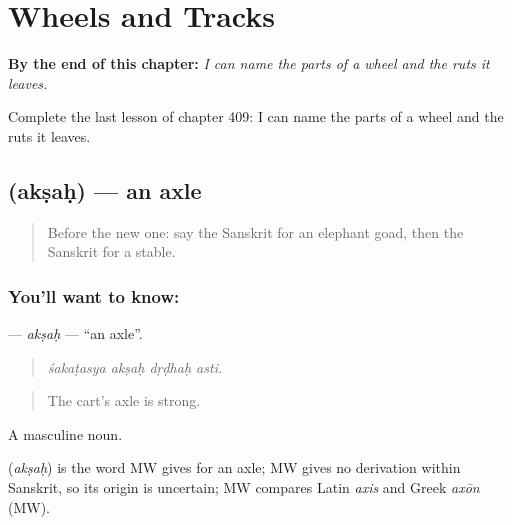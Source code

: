 
\chapter{Wheels and Tracks}
\label{ch:sa-wheels-and-tracks}

\begin{chapteropening}
\textbf{By the end of this chapter:} \emph{I can name the parts of a wheel and the ruts it leaves.}

Complete the last lesson of chapter 409: I can name the parts of a wheel and the ruts it leaves.
\end{chapteropening}

\section[\texorpdfstring{\sk{अक्षः} (akṣaḥ)}{अक्षः (akṣaḥ)}]{ (akṣaḥ) — an axle}

\label{lesson:SA-C409-aksah}



\begin{quote}
Before the new one: say the Sanskrit for an elephant goad, then the Sanskrit for a stable.
\end{quote}

\subsection*{You'll want to know: }
\textbf{} — \emph{akṣaḥ} — \textquotedblleft{}an axle\textquotedblright{}.

\begin{quote}
   
\end{quote}

\begin{quote}
\emph{śakaṭasya akṣaḥ dṛḍhaḥ asti.}
\end{quote}

\begin{quote}
The cart's axle is strong.
\end{quote}

A masculine noun.

\begin{cousinweb}
\textbf{} (\emph{akṣaḥ}) is the word MW gives for an axle; MW gives no derivation within Sanskrit, so its origin is uncertain; MW compares Latin \emph{axis} and Greek \emph{axōn} (MW).
\end{cousinweb}

